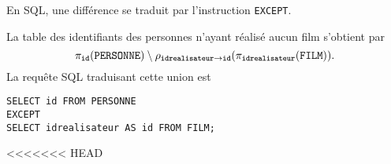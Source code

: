 En SQL, une différence se traduit par l'instruction \texttt{EXCEPT}.
\begin{exemple}
La table des identifiants des personnes n'ayant réalisé aucun film s'obtient par 
\begin{equation*}
  \pi_{\mathtt{id}}(\mathtt{PERSONNE})\setminus \rho_{\mathtt{idrealisateur}\rightarrow\mathtt{id}}(\pi_{\mathtt{idrealisateur}}(\mathtt{FILM})).
\end{equation*}
La requête SQL traduisant cette union est 
\begin{verbatim}
SELECT id FROM PERSONNE
EXCEPT
SELECT idrealisateur AS id FROM FILM;
\end{verbatim}
\end{exemple}

<<<<<<< HEAD
%
%
%
%
%
%

